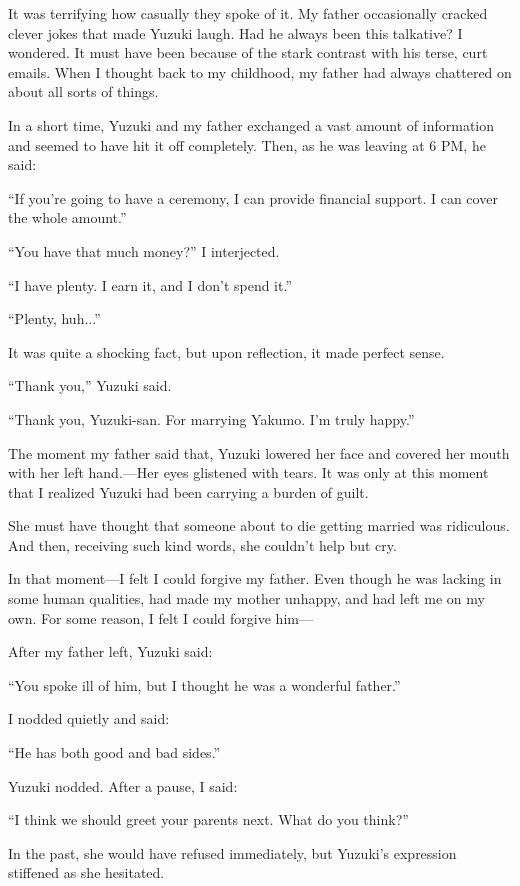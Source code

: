 \documentclass[
    a4paper,
    12pt,
    twoside,
    openany,
    UTF8,
    fontset=windows
]{ctexbook}
\begin{document}
It was terrifying how casually they spoke of it. My father occasionally cracked clever jokes that made Yuzuki laugh. Had he always been this talkative? I wondered. It must have been because of the stark contrast with his terse, curt emails. When I thought back to my childhood, my father had always chattered on about all sorts of things.

In a short time, Yuzuki and my father exchanged a vast amount of information and seemed to have hit it off completely. Then, as he was leaving at 6 PM, he said:

``If you're going to have a ceremony, I can provide financial support. I can cover the whole amount.''

``You have that much money?'' I interjected.

``I have plenty. I earn it, and I don't spend it.''

``Plenty, huh...''

It was quite a shocking fact, but upon reflection, it made perfect sense.

``Thank you,'' Yuzuki said.

``Thank you, Yuzuki-san. For marrying Yakumo. I'm truly happy.''

The moment my father said that, Yuzuki lowered her face and covered her mouth with her left hand.---Her eyes glistened with tears. It was only at this moment that I realized Yuzuki had been carrying a burden of guilt.

She must have thought that someone about to die getting married was ridiculous. And then, receiving such kind words, she couldn't help but cry.

In that moment---I felt I could forgive my father. Even though he was lacking in some human qualities, had made my mother unhappy, and had left me on my own. For some reason, I felt I could forgive him---

After my father left, Yuzuki said:

``You spoke ill of him, but I thought he was a wonderful father.''

I nodded quietly and said:

``He has both good and bad sides.''

Yuzuki nodded. After a pause, I said:

``I think we should greet your parents next. What do you think?''

In the past, she would have refused immediately, but Yuzuki's expression stiffened as she hesitated.
\end{document}
